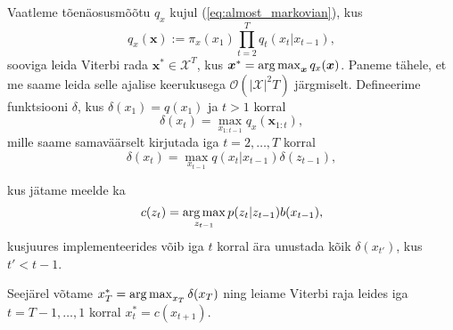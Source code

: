 Vaatleme tõenäosusmõõtu $q_x$ kujul (\ref{eq:almost_markovian}), kus
$$
q_x(\bm{x}) := \pi_x(x_1) \prod_{t=2}^T q_{t}(x_{t} | x_{t-1}),$$
sooviga leida Viterbi rada $\bm{x}^* \in \mathcal{X}^T$, kus $\bm{x}^* = \operatorname*{arg\,max}_{\bm{x}} q_x(\bm{x})$.
Paneme tähele, et me saame leida selle ajalise keerukusega $\mathcal{O} (|\mathcal{X}|^2 T)$ järgmiselt. Defineerime funktsiooni  $\delta$, kus $\delta(x_1) = q(x_1)$ ja $t > 1$ korral
$$\delta(x_t) = \max_{x_{1:t-1}} q_x(\bm{x}_{1:t}),$$
mille saame samaväärselt kirjutada
iga  $t = 2,\ldots,T$ korral 
$$\delta(x_t) = \max_{x_{t-1}} q(x_t | x_{t-1}) \delta(z_{t-1}),$$


kus jätame meelde ka
$$c(z_t) = \operatorname*{arg\,max}_{z_{t-1}} p(z_t | z_{t-1}) b(x_{t-1}),$$
kusjuures implementeerides võib iga $t$ korral ära unustada kõik $\delta(x_{t'})$, kus $t' < t - 1$.

Seejärel võtame $x_T^* = \operatorname*{arg\,max}_{x_{T}} \delta(x_T)$ ning leiame Viterbi raja leides iga $t = T-1,\ldots,1$ korral $x_t^* = c(x_{t+1})$.





